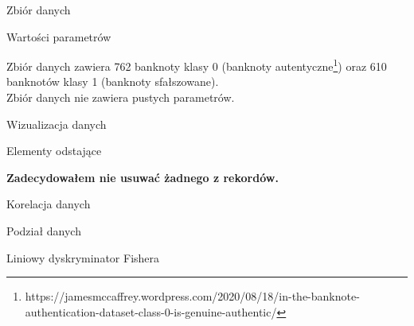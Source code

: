 \documentclass[a4paper]{article}
\begin{document}
\begin{section}{Zbiór danych}
\begin{subsection}{Wartości parametrów}

Zbiór danych zawiera 762 banknoty klasy 0 (banknoty autentyczne\footnote{https://jamesmccaffrey.wordpress.com/2020/08/18/in-the-banknote-authentication-dataset-class-0-is-genuine-authentic/}) oraz 610 banknotów klasy 1 (banknoty sfałszowane).\\
Zbiór danych nie zawiera pustych parametrów.\\
\end{subsection}
\begin{subsection}{Wizualizacja danych}
				
				\begin{figure}
  \noindent{}
\end{figure}
\end{subsection}
\newpage
\begin{subsection}{Elementy odstające}
				
				\newpage
				
				\textbf{Zadecydowałem nie usuwać żadnego z rekordów.}
				\newpage
\end{subsection}
\begin{subsection}{Korelacja danych}
				
				
				\newpage
\end{subsection}
\begin{subsection}{Podział danych}
				
\end{subsection}
\end{section}
\begin{section}{Liniowy dyskryminator Fishera}
				
				\newpage
				
\end{section}
\end{document}
